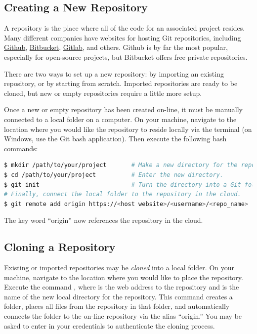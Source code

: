 \subsection*{Creating a New Repository} %

A repository is the place where all of the code for an associated project resides.
Many different companies have websites for hosting Git repositories, including
\href{https://github.com/}{Github}, \href{https://bitbucket.org/}{Bitbucket}, \href{https://gitlab.com/}{Gitlab}, and others.
Github is by far the most popular, especially for open-source projects, but Bitbucket offers free private repositories.

There are two ways to set up a new repository: by importing an existing repository, or by starting from scratch.
Imported repositories are ready to be cloned, but new or empty repositories require a little more setup.

Once a new or empty repository has been created on-line, it must be manually connected to a local folder on a computer.
On your machine, navigate  to the location where you would like the repository to reside locally via the terminal (on Windows, use the Git bash application).
Then execute the following bash commands:

\begin{lstlisting}[language=bash]
$ mkdir /path/to/your/project       # Make a new directory for the repository.
$ cd /path/to/your/project          # Enter the new directory.
$ git init                          # Turn the directory into a Git folder.
# Finally, connect the local folder to the repository in the cloud.
$ git remote add origin https://<host website>/<username>/<repo_name>
\end{lstlisting}
The key word ``origin'' now references the repository in the cloud.

\subsection*{Cloning a Repository} %

Existing or imported repositories may be \emph{cloned} into a local folder.
On your machine, navigate to the location where you would like to place the repository.
Execute the command , where  is the web address to the repository and  is the name of the new local directory for the repository.
This command creates a folder, places all files from the repository in that folder, and automatically connects the folder to the on-line repository via the alias ``origin.''
You may be asked to enter in your credentials to authenticate the cloning process.

